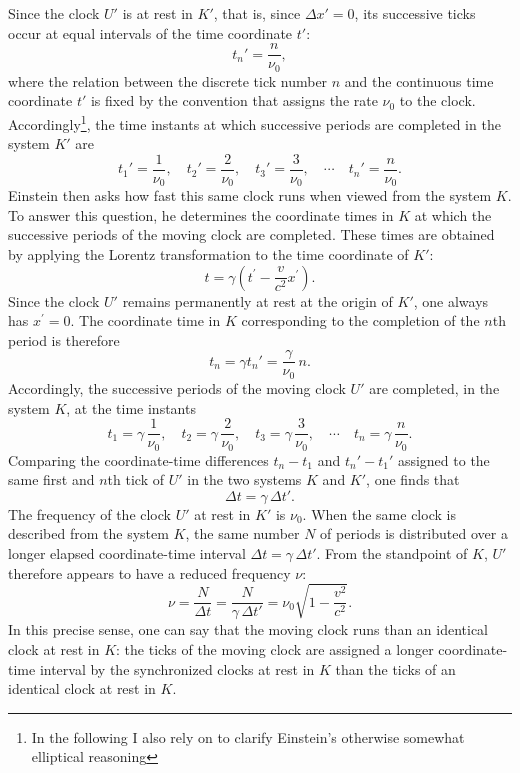 \documentclass[submitted,12pt]{article}
\begin{document}
Since the clock $U'$ is at rest in $K'$, that is, since $\Delta x'=0$, its successive ticks occur at equal intervals of the time coordinate $t'$:
%
\begin{equation*}
t_n'=\frac{n}{\nu_0},
\end{equation*}
%
where the relation between the discrete tick number $n$ and the continuous time coordinate $t'$ is fixed by the convention that assigns the rate $\nu_0$ to the clock. Accordingly\footnote{In the following I also rely on \cite[131\psq]{Einstein1910} to clarify Einstein’s otherwise somewhat elliptical reasoning}, the time instants at which successive periods are completed in the system $K'$ are
%
\begin{equation*}
t_1'=\frac{1}{\nu_0}, \quad
t_2'=\frac{2}{\nu_0}, \quad
t_3'=\frac{3}{\nu_0}, \quad \cdots \quad
t_n'=\frac{n}{\nu_0}.
\end{equation*}
%
Einstein then asks how fast this same clock runs when viewed from the system $K$. To answer this question, he determines the coordinate times in $K$ at which the successive periods of the moving clock are completed. These times are obtained by applying the Lorentz transformation to the time coordinate of $K'$:
%
\begin{equation*}
t=\gamma \left(t^{\prime}-\frac{v}{c^2} x^{\prime}\right).
\end{equation*}
%
Since the clock $U'$ remains permanently at rest at the origin of $K'$, one always has $x^{\prime}=0$. The coordinate time in $K$ corresponding to the completion of the $n$th period is therefore
%
\begin{equation*}
t_n=\gamma t_n'=\frac{\gamma}{\nu_0}\,n.
\end{equation*}
%
Accordingly, the successive periods of the moving clock $U'$ are completed, in the system $K$, at the time instants
%
\begin{equation*}
t_1=\gamma\,\frac{1}{\nu_0}, \quad
t_2=\gamma\,\frac{2}{\nu_0}, \quad
t_3=\gamma\,\frac{3}{\nu_0}, \quad \cdots \quad
t_n=\gamma\,\frac{n}{\nu_0}.
\end{equation*}
%
Comparing the coordinate-time differences $t_n-t_1$ and $t_n'-t_1'$ assigned to the same first and $n$th tick of $U'$ in the two systems $K$ and $K'$, one finds that
%
\begin{equation*}
\Delta t=\gamma\,\Delta t'.
\end{equation*}
%
The frequency of the clock $U'$ at rest in $K'$ is $\nu_0$. When the same clock is described from the system $K$, the same number $N$ of periods is distributed over a longer elapsed coordinate-time interval $\Delta t=\gamma\,\Delta t'$. From the standpoint of $K$, $U'$ therefore appears to have a reduced frequency $\nu$:
%
\begin{equation}\label{eq:frequency}
\nu = \frac{N}{\Delta t} = \frac{N}{\gamma\,\Delta t'} = \nu_0 \sqrt{1-\frac{v^2}{c^2}}.
\end{equation}
%
In this precise sense, one can say that the moving clock runs  than an identical clock at rest in $K$: the ticks of the moving clock are assigned a longer coordinate-time interval by the synchronized clocks at rest in $K$ than the ticks of an identical clock at rest in $K$.
\end{document}
